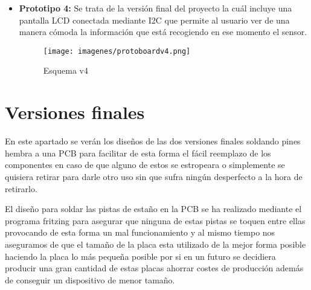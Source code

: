 \begin{itemize}
	\item \textbf{Prototipo 4: } Se trata de la versión final del proyecto la cuál incluye una pantalla LCD conectada mediante I2C que permite al usuario ver de una manera cómoda la información que está recogiendo en ese momento el sensor.
	
	\begin{figure}[H]
		\centering
		\texttt{[image: imagenes/protoboardv4.png]}
		\caption{Esquema v4}
		\label{fig:protoboardv4}
	\end{figure}
	
\end{itemize}

\section{Versiones finales}

En este apartado se verán los diseños de las dos versiones finales soldando pines hembra a una PCB para facilitar de esta forma el fácil reemplazo de los componentes en caso de que alguno de estos se estropeara o simplemente se quisiera retirar para darle otro uso sin que sufra ningún desperfecto a la hora de retirarlo.

El diseño para soldar las pistas de estaño en la PCB se ha realizado mediante el programa fritzing para asegurar que ninguna de estas pistas se toquen entre ellas provocando de esta forma un mal funcionamiento y al mismo tiempo nos aseguramos de que el tamaño de la placa esta utilizado de la mejor forma posible haciendo la placa lo más pequeña posible por si en un futuro se decidiera producir una gran cantidad de estas placas ahorrar costes de producción además de conseguir un dispositivo de menor tamaño.

